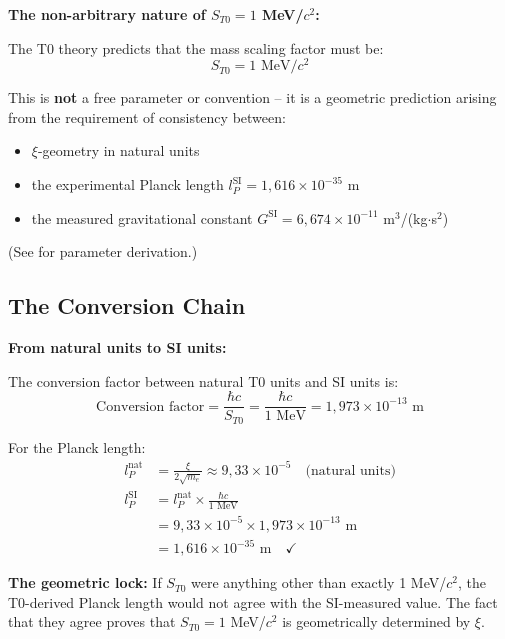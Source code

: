 	\begin{keyresult}
		\textbf{The non-arbitrary nature of $S_{T0} = 1$ MeV/$c^2$:}
		
		The T0 theory predicts that the mass scaling factor must be:
		\begin{equation}
			\boxed{S_{T0} = 1 \text{ MeV}/c^2}
		\end{equation}
		
		This is \textbf{not} a free parameter or convention -- it is a geometric prediction arising from the requirement of consistency between:
		\begin{itemize}
			\item $\xi$-geometry in natural units
			\item the experimental Planck length $l_P^{\text{SI}} = 1{,}616 \times 10^{-35}$ m
			\item the measured gravitational constant $G^{\text{SI}} = 6{,}674 \times 10^{-11}$ m$^3$/(kg$\cdot$s$^2$)
		\end{itemize}
		(See \cite{parameter_derivation_En} for parameter derivation.)
	\end{keyresult}
	
	\subsection{The Conversion Chain}
	
	\begin{derivation}
		\textbf{From natural units to SI units:}
		
		The conversion factor between natural T0 units and SI units is:
		\begin{equation}
			\text{Conversion factor} = \frac{\hbar c}{S_{T0}} = \frac{\hbar c}{1 \text{ MeV}} = 1{,}973 \times 10^{-13} \text{ m}
		\end{equation}
		
		For the Planck length:
		\begin{align}
			l_P^{\text{nat}} &= \frac{\xi}{2\sqrt{m_e}} \approx 9{,}33 \times 10^{-5} \quad \text{(natural units)} \\
			l_P^{\text{SI}} &= l_P^{\text{nat}} \times \frac{\hbar c}{1 \text{ MeV}} \\
			&= 9{,}33 \times 10^{-5} \times 1{,}973 \times 10^{-13} \text{ m} \\
			&= 1{,}616 \times 10^{-35} \text{ m} \quad \checkmark
		\end{align}
		
		\textbf{The geometric lock:} If $S_{T0}$ were anything other than exactly 1 MeV/$c^2$, the T0-derived Planck length would not agree with the SI-measured value. The fact that they agree proves that $S_{T0} = 1$ MeV/$c^2$ is geometrically determined by $\xi$.
	\end{derivation}
	

